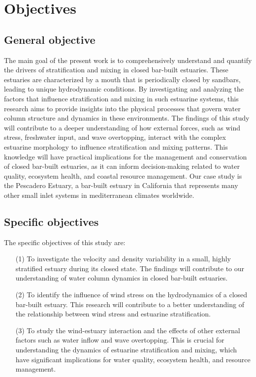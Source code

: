 \documentclass[tesis.tex]{subfiles}
\begin{document}
\section{Objectives}

\subsection{General objective}

The main goal of the present work is to comprehensively understand and quantify the drivers of stratification and mixing in closed bar-built estuaries. These estuaries are characterized by a mouth that is periodically closed by sandbars, leading to unique hydrodynamic conditions. By investigating and analyzing the factors that influence stratification and mixing in such estuarine systems, this research aims to provide insights into the physical processes that govern water column structure and dynamics in these environments. The findings of this study will contribute to a deeper understanding of how external forces, such as wind stress, freshwater input, and wave overtopping, interact with the complex estuarine morphology to influence stratification and mixing patterns. This knowledge will have practical implications for the management and conservation of closed bar-built estuaries, as it can inform decision-making related to water quality, ecosystem health, and coastal resource management. Our case study is the Pescadero Estuary, a bar-built estuary in California that represents many other small inlet systems in mediterranean climates worldwide. \\

\subsection{Specific objectives}

The specific objectives of this study are:
\begin{enumerate}
    \item [(1)]  To investigate the velocity and density variability in a small, highly stratified estuary during its closed state. The findings will contribute to our understanding of water column dynamics in closed bar-built estuaries.
    \item [(2)] To identify the influence of wind stress on the hydrodynamics of a closed bar-built estuary. This research will contribute to a better understanding of the relationship between wind stress and estuarine stratification.
    \item [(3)] To study the wind-estuary interaction and the effects of other external factors such as water inflow and wave overtopping. This is crucial for understanding the dynamics of estuarine stratification and mixing, which have significant implications for water quality, ecosystem health, and resource management.
\end{enumerate}
\end{document}
